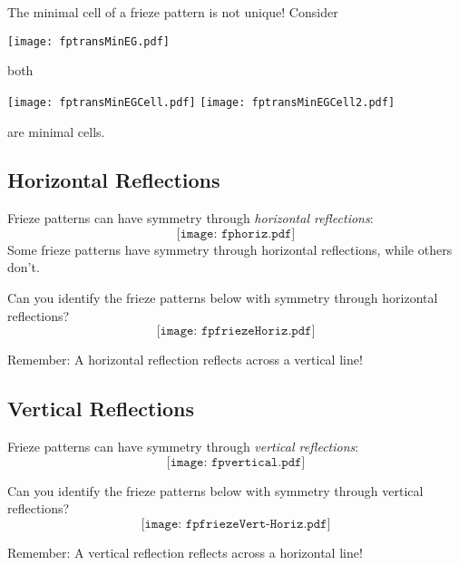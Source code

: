 \documentclass{ximera}
\begin{document}
\begin{warning}
The minimal cell of a frieze pattern is not unique! Consider
\begin{center}
\texttt{[image: fptransMinEG.pdf]}
\end{center}
both
\begin{center}
\texttt{[image: fptransMinEGCell.pdf]} \qquad{}\qquad  \texttt{[image: fptransMinEGCell2.pdf]}
\end{center}
are minimal cells.
\end{warning} 



\subsection*{Horizontal Reflections}

Frieze patterns can have symmetry through \textit{horizontal reflections}:
\[
\texttt{[image: fphoriz.pdf]}
\]
Some frieze patterns have symmetry through horizontal reflections, while
others don't.
\begin{question} 
Can you identify the frieze patterns below with symmetry through
horizontal reflections?
\[
\texttt{[image: fpfriezeHoriz.pdf]}
\]
\end{question}

\begin{warning}
Remember: A horizontal reflection reflects across a vertical line!
\end{warning}



\subsection*{Vertical Reflections}


Frieze patterns can have symmetry through \textit{vertical reflections}:
\[
\texttt{[image: fpvertical.pdf]}
\]

\begin{question}
Can you identify the frieze patterns below with symmetry through
vertical reflections?
\[
\texttt{[image: fpfriezeVert-Horiz.pdf]}
\]
\end{question}

\begin{warning}
Remember: A vertical reflection reflects across a horizontal
line!
\end{warning}
\end{document}
